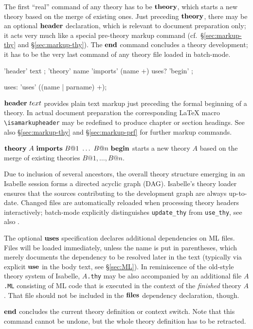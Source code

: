 The first ``real'' command of any theory has to be ${\mathord{\mathbf{theory}}}$, which
starts a new theory based on the merge of existing ones.  Just
preceding ${\mathord{\mathbf{theory}}}$, there may be an optional ${\mathord{\mathbf{header}}}$
declaration, which is relevant to document preparation only; it acts
very much like a special pre-theory markup command (cf.\ 
\S\ref{sec:markup-thy} and \S\ref{sec:markup-thy}).  The ${\mathord{\mathbf{end}}}$
command concludes a theory development; it has to be the very last
command of any theory file loaded in batch-mode.

\begin{rail}
  'header' text
  ;
  'theory' name 'imports' (name +) uses? 'begin'
  ;

  uses: 'uses' ((name | parname) +);
\end{rail}

\begin{descr}
\item [${\mathord{\mathbf{header}}}~text$] provides plain text markup just preceding
  the formal beginning of a theory.  In actual document preparation the
  corresponding {\LaTeX} macro \verb,\isamarkupheader, may be redefined to
  produce chapter or section headings.  See also \S\ref{sec:markup-thy} and
  \S\ref{sec:markup-prf} for further markup commands.
  
\item [${\mathord{\mathbf{theory}}}~A~{\mathord{\mathbf{imports}}}~B@1~\ldots~B@n~{\mathord{\mathbf{begin}}}$]
  starts a new theory $A$ based on the merge of existing theories $B@1, \dots,
  B@n$.
  
  Due to inclusion of several ancestors, the overall theory structure emerging
  in an Isabelle session forms a directed acyclic graph (DAG).  Isabelle's
  theory loader ensures that the sources contributing to the development graph
  are always up-to-date.  Changed files are automatically reloaded when
  processing theory headers interactively; batch-mode explicitly distinguishes
  \verb,update_thy, from \verb,use_thy,, see also \cite{isabelle-ref}.
  
  The optional ${\mathord{\mathbf{uses}}}$ specification declares additional
  dependencies on ML files.  Files will be loaded immediately, unless the name
  is put in parentheses, which merely documents the dependency to be resolved
  later in the text (typically via explicit ${\mathord{\mathbf{use}}}$ in the body text,
  see \S\ref{sec:ML}).  In reminiscence of the old-style theory system of
  Isabelle, \texttt{$A$.thy} may be also accompanied by an additional file
  \texttt{$A$.ML} consisting of ML code that is executed in the context of the
  \emph{finished} theory $A$.  That file should not be included in the
  ${\mathord{\mathbf{files}}}$ dependency declaration, though.
  
\item [${\mathord{\mathbf{end}}}$] concludes the current theory definition or context switch.
  Note that this command cannot be undone, but the whole theory definition has
  to be retracted.

\end{descr}



